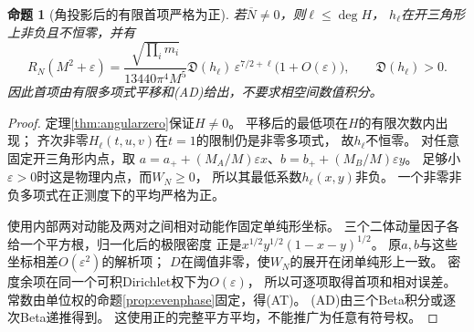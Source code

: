 \documentclass[11pt,a4paper]{ctexart}
\theoremstyle{cnplain}\newtheorem{theorem}{定理}[section]
\newtheorem{proposition}[theorem]{命题}
\theoremstyle{definition}\newtheorem{definition}[theorem]{定义}
\theoremstyle{remark}\newtheorem{remark}[theorem]{注}
\begin{document}
\begin{proposition}[角投影后的有限首项严格为正]\label{prop:angularjet}
若$\overline N\ne0$，则$\ell\le\deg H$，
$h_\ell$在开三角形上非负且不恒零，并有
\[
 R_N(M^2+\varepsilon)=
 \frac{\sqrt{\prod_i m_i}}{13440\pi^4M^5}
 \mathfrak D(h_\ell)\,
 \varepsilon^{7/2+\ell}\bigl(1+O(\varepsilon)\bigr),
 \qquad \mathfrak D(h_\ell)>0.
 \tag{AT}\label{eq:angularthreshold}
\]
因此首项由有限多项式平移和(AD)给出，不要求相空间数值积分。
\end{proposition}
\begin{proof}
定理\ref{thm:angularzero}保证$H\ne0$。
平移后的最低项在$H$的有限次数内出现；
齐次非零$H_\ell(t,u,v)$在$t=1$的限制仍是非零多项式，
故$h_\ell$不恒零。
对任意固定开三角形内点，取
$a=a_++(M_A/M)\varepsilon x$、$b=b_++(M_B/M)\varepsilon y$。
足够小$\varepsilon>0$时这是物理内点，而$W_N\ge0$，
所以其最低系数$h_\ell(x,y)$非负。
一个非零非负多项式在正测度下的平均严格为正。

使用内部两对动能及两对之间相对动能作固定单纯形坐标。
三个二体动量因子各给一个平方根，归一化后的极限密度
正是$x^{1/2}y^{1/2}(1-x-y)^{1/2}$。
原$a,b$与这些坐标相差$O(\varepsilon^2)$的解析项；
$D$在阈值非零，使$W_N$的展开在闭单纯形上一致。
密度余项在同一个可积Dirichlet权下为$O(\varepsilon)$，
所以可逐项取得首项和相对误差。
常数由单位权的命题\ref{prop:evenphase}固定，得(AT)。
(AD)由三个Beta积分或逐次Beta递推得到。
这使用正的完整平方平均，不能推广为任意有符号权。
\end{proof}
\end{document}
